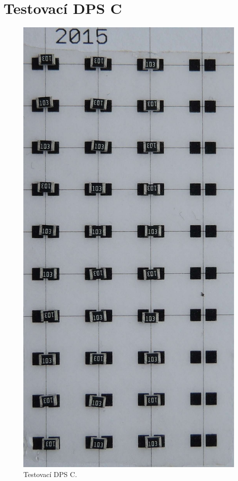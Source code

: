 \section{Testovací DPS C}
\begin{figure}[H]
  \centering
    \includegraphics[height=0.35\paperheight ]{obrazky/C2.jpg}%
    \caption{Testovací DPS C.}
    \label{img:DeskaC}
\end{figure}



